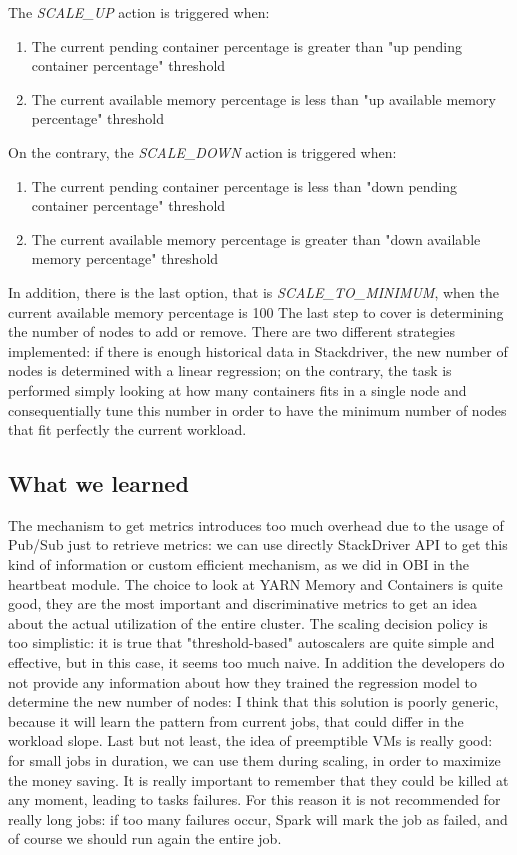 \documentclass[12pt,twoside,cucitura]{toptesi}
\begin{document}
The \textit{SCALE\_UP} action is triggered when:
\begin{enumerate}
	\item The current pending container percentage is greater than "up pending container percentage" threshold
	\item The current available memory percentage is less than "up available memory percentage" threshold
\end{enumerate}

On the contrary, the \textit{SCALE\_DOWN} action is triggered when:
\begin{enumerate}
	\item The current pending container percentage is less than "down pending container percentage" threshold
	\item The current available memory percentage is greater than "down available memory percentage" threshold
\end{enumerate}

In addition, there is the last option, that is \textit{SCALE\_TO\_MINIMUM}, when the current available memory percentage is 100%
The last step to cover is determining the number of nodes to add or remove. There are two different strategies implemented: if there is enough historical data in Stackdriver, the new number of nodes is determined with a linear regression; on the contrary, the task is performed simply looking at how many containers fits in a single node and consequentially tune this number in order to have the minimum number of nodes that fit perfectly the current workload.

\subsection{What we learned}
The mechanism to get metrics introduces too much overhead due to the usage of Pub/Sub just to retrieve metrics: we can use directly StackDriver API to get this kind of information or custom efficient mechanism, as we did in OBI in the heartbeat module.
The choice to look at YARN Memory and Containers is quite good, they are the most important and discriminative metrics to get an idea about the actual utilization of the entire cluster. The scaling decision policy is too simplistic: it is true that "threshold-based" autoscalers are quite simple and effective, but in this case, it seems too much naive. In addition the developers do not provide any information about how they trained the regression model to determine the new number of nodes: I think that this solution is poorly generic, because it will learn the pattern from current jobs, that could differ in the workload slope. Last but not least, the idea of preemptible VMs is really good: for small jobs in duration, we can use them during scaling, in order to maximize the money saving. It is really important to remember that they could be killed at any moment, leading to tasks failures. For this reason it is not recommended for really long jobs: if too many failures occur, Spark will mark the job as failed, and of course we should run again the entire job.
\end{document}
